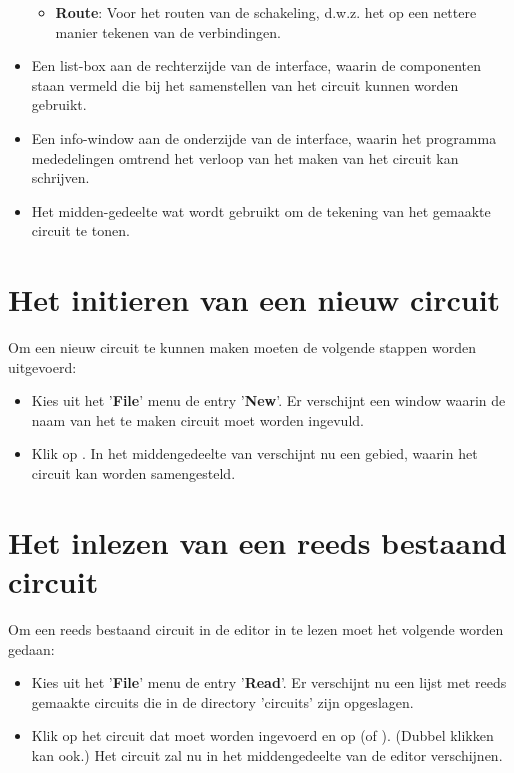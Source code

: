 \begin{itemize}
\begin{itemize}
\item {\bf Route}: Voor het routen van de schakeling, d.w.z. het op een nettere manier tekenen van de verbindingen.
\end{itemize}
\item Een list-box aan de rechterzijde van de interface, waarin de componenten
      staan vermeld die bij het samenstellen van het circuit kunnen worden gebruikt.
\item Een info-window aan de onderzijde van de interface, waarin het
      programma mededelingen omtrend het verloop van het maken van het
      circuit kan schrijven.
\item Het midden-gedeelte wat wordt gebruikt om de tekening van het
      gemaakte circuit te tonen.
\end{itemize}

\section{Het initieren van een nieuw circuit}
Om een nieuw circuit te kunnen maken moeten de volgende stappen
worden uitgevoerd:
\begin{itemize}
\item Kies uit het '{\bf File}' menu de entry '{\bf New}'. Er verschijnt een window
      waarin de naam van het te maken circuit moet worden ingevuld.
\item Klik op . In het middengedeelte van  verschijnt nu
      een gebied, waarin het circuit kan worden samengesteld.
\end{itemize}

\section{Het inlezen van een reeds bestaand circuit}
Om een reeds bestaand circuit in de editor in te lezen moet het volgende
worden gedaan:
\begin{itemize}
\item Kies uit het '{\bf File}' menu de entry '{\bf Read}'. Er verschijnt nu een lijst
      met reeds gemaakte circuits die in de directory 'circuits' zijn opgeslagen.
\item Klik op het circuit dat moet worden ingevoerd en op  (of ).
    (Dubbel klikken kan ook.)
    Het circuit zal nu in het middengedeelte van de editor verschijnen.
\end{itemize}

